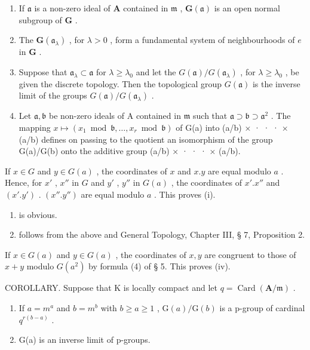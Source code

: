 \begin{enumerate}
\def\labelenumi{(\roman{enumi})}
\item
  If \(\mathfrak{a}\) is a non-zero ideal of \(\mathbf{A}\) contained in \(\mathfrak{m}\) , \(\mathbf{G}(\mathfrak{a})\) is an open normal subgroup of \(\mathbf{G}\) .
\item
  The \(\mathbf{G}(\mathfrak{a}_{\lambda})\) , for \(\lambda > 0\) , form a fundamental system of neighbourhoods of \(e\) in \(\mathbf{G}\) .
\item
  Suppose that \(\mathfrak{a}_{\lambda} \subset \mathfrak{a}\) for \(\lambda \geqslant \lambda_0\) and let the \(G(\mathfrak{a}) / G(\mathfrak{a}_{\lambda})\) , for \(\lambda \geqslant \lambda_0\) , be given the discrete topology. Then the topological group \(G(\mathfrak{a})\) is the inverse limit of the groups \(G(\mathfrak{a}) / G(\mathfrak{a}_{\lambda})\) .
\item
  Let \(\mathfrak{a},\mathfrak{b}\) be non-zero ideals of A contained in \(\mathfrak{m}\) such that \(\mathfrak{a} \supset \mathfrak{b} \supset \mathfrak{a}^2\) . The mapping \(x \mapsto (x_1 \bmod \mathfrak{b}, \ldots, x_r \bmod \mathfrak{b})\) of G(a) into (a/b) × · · · × (a/b) defines on passing to the quotient an isomorphism of the group G(a)/G(b) onto the additive group (a/b) × · · · × (a/b).
\end{enumerate}

If \(x \in G\) and \(y \in G(a)\) , the coordinates of \(x\) and \(x.y\) are equal modulo \(a\) . Hence, for \(x'\) , \(x''\) in \(G\) and \(y'\) , \(y''\) in \(G(a)\) , the coordinates of \(x'.x''\) and \((x'.y')\) . \((x''.y'')\) are equal modulo \(a\) . This proves (i).

\begin{enumerate}
\def\labelenumi{(\roman{enumi})}
\setcounter{enumi}{1}
\item
  is obvious.
\item
  follows from the above and General Topology, Chapter III, § 7, Proposition 2.
\end{enumerate}

If \(x \in G(a)\) and \(y \in G(a)\) , the coordinates of \(x, y\) are congruent to those of \(x + y\) modulo \(G(a^2)\) by formula (4) of § 5. This proves (iv).

COROLLARY. Suppose that K is locally compact and let \(q = \operatorname{Card}(\mathbf{A} / \mathfrak{m})\) .

\begin{enumerate}
\def\labelenumi{(\roman{enumi})}
\item
  If \(a = m^{a}\) and \(b = m^{b}\) with \(b \geqslant a \geqslant 1\) , \(\mathrm{G}(a)/\mathrm{G}(b)\) is a p-group of cardinal \(q^{r(b-a)}\) .
\item
  G(a) is an inverse limit of p-groups.
\end{enumerate}

